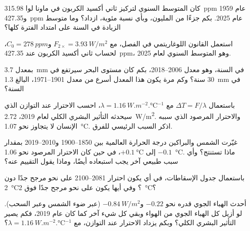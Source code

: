 \begin{exercise}[$\star\star$]\label{exo:g12:climate-change:6}
كان المتوسط السنوي لتركيز ثاني أكسيد الكربون في ماونا لوا
\qty{315.98}{ppm} عام 1959 و\qty{427.35}{ppm} عام 2025. بكم جزءًا من المليون،
وبأي نسبة مئوية، ازداد؟ وما متوسط الزيادة في
السنة على امتداد الفترة كلها؟
\end{exercise}

\begin{exercise}[$\star\star$]\label{exo:g12:climate-change:7}
استعمل القانون اللوغاريتمي في الفصل، مع $F_{2\times} =
\qty{3.93}{W/m^2}$ و$C_0 = \qty{278}{ppm}$، لحساب 
ثاني أكسيد الكربون عند \qty{427.35}{ppm}، وهو المتوسط السنوي لعام 2025.
\end{exercise}

\begin{exercise}[$\star\star$]\label{exo:g12:climate-change:8}
بمعدل \qty{3.7}{mm} في السنة، وهو معدل 2006--2018، بكم كان مستوى البحر سيرتفع
في 30 سنة؟ وكم مرة يكون هذا المعدل أسرع من معدل
1901--1971، البالغ \qty{1.3}{mm} في السنة؟
\end{exercise}

\begin{exercise}[$\star\star$]\label{exo:g12:climate-change:9}
باستعمال $\Delta T = F/\lambda$ مع $\lambda = \qty{1.16}{W.m^{-2}.\degreeCelsius^{-1}}$،
احسب الاحترار عند التوازن الذي سيحدثه التأثير البشري الكلي لعام 2019،
\qty{2.72}{W/m^2}. والاحترار المرصود الذي سببه الإنسان لا يتجاوز
نحو \qty{1.07}{\degreeCelsius}. اذكر السبب الرئيسي للفرق.
\end{exercise}

\begin{exercise}[$\star\star$]\label{exo:g12:climate-change:10}
غيّرت الشمس والبراكين درجة الحرارة العالمية بين 1850--1900
و2010--2019 بمقدار $-0.1$ إلى $+\qty{0.1}{\degreeCelsius}$، في حين كان الاحترار
المرصود نحو \qty{1.06}{\degreeCelsius}. ماذا تستنتج؟ وأي
سبب طبيعي آخر يجب استبعاده أيضًا، وماذا يقول
التقييم عنه؟
\end{exercise}

\begin{exercise}[$\star\star$]\label{exo:g12:climate-change:11}
باستعمال جدول الإسقاطات، في أي  يكون احترار
2081--2100 على نحو مرجح جدًا دون \qty{2}{\degreeCelsius}؟ وفي أيها يكون
على نحو مرجح جدًا فوق \qty{2}{\degreeCelsius}؟
\end{exercise}

\begin{exercise}[$\star\star\star$]\label{exo:g12:climate-change:12}
أحدث الهباء الجوي  قدره نحو $-0.22$ و$\qty{-0.84}{W/m^2}$
(عبر ضوء الشمس وعبر السحب). لو أزيل كل الهباء الجوي من
الهواء وبقي كل شيء آخر كما كان عام 2019، فكم يصير التأثير البشري
الكلي؟ وبكم يزداد الاحترار عند التوازن، مع
$\lambda = \qty{1.16}{W.m^{-2}.\degreeCelsius^{-1}}$؟
\end{exercise}

